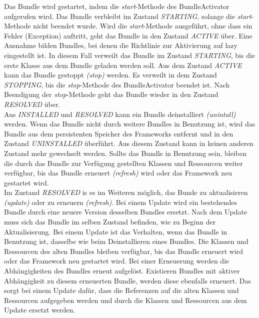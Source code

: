 Das Bundle wird gestartet, indem die \textit{start}-Methode des BundleActivator aufgerufen wird. Das Bundle verbleibt im Zustand \textit{STARTING}, solange die \textit{start}-Methode 
nicht beendet wurde. Wird die \textit{start}-Methode ausgeführt, ohne dass ein Fehler (Exception) auftritt, geht das Bundle in den Zustand \textit{ACTIVE} über.
Eine Ausnahme bilden Bundles, bei denen die Richtlinie zur Aktivierung auf lazy eingestellt ist.
In diesem Fall verweilt das Bundle im Zustand \textit{STARTING}, bis die erste Klasse aus dem Bundle geladen werden soll.
Aus dem Zustand \textit{ACTIVE} kann das Bundle gestoppt \textit{(stop)} werden. Es verweilt in dem Zustand \textit{STOPPING}, bis die \textit{stop}-Methode des BundleActivator beendet ist.
Nach Beendigung der \textit{stop}-Methode geht das Bundle wieder in den Zustand \textit{RESOLVED} über.\\

Aus \textit{INSTALLED} und \textit{RESOLVED} kann ein Bundle deinstalliert \textit{(unintall)} werden. Wenn das Bundle nicht durch weitere Bundles in Benutzung ist, wird das Bundle aus 
dem persistenten Speicher des Frameworks entfernt und in den Zustand \textit{UNINSTALLED} überführt. Aus diesem Zustand kann in keinen anderen Zustand mehr gewechselt werden.
Sollte das Bundle in Benutzung sein, bleiben die durch das Bundle zur Verfügung gestellten Klassen und Ressourcen weiter verfügbar, bis das Bundle erneuert \textit{(refresh)} wird 
oder das Framework neu gestartet wird.\\

Im Zustand \textit{RESOLVED} is es im Weiteren möglich, das Bunde zu aktualisieren \textit{(update)} oder zu erneuern \textit{(refresh)}.
Bei einem Update wird ein bestehendes Bundle durch eine neuere Version desselben Bundles ersetzt. Nach dem Update muss sich das Bundle im selben Zustand befinden,
wie zu Beginn der Aktualisierung. Bei einem Update ist das Verhalten, wenn das Bundle in Benutzung ist, dasselbe wie beim Deinstallieren eines Bundles.
Die  Klassen und Ressourcen des alten Bundles bleiben verfügbar, bis das Bundle erneuert wird oder das Framework neu gestartet wird.
Bei einer Erneuerung werden die Abhängigkeiten des Bundles erneut aufgelöst.
Existieren Bundles mit aktiver Abhängigkeit zu diesem erneuerten Bundle, werden diese ebenfalls erneuert.
Das sorgt bei einem Update dafür, dass die Referenzen auf die alten Klassen und Ressourcen aufgegeben werden und durch die Klassen und Ressourcen aus dem Update ersetzt werden.\\

